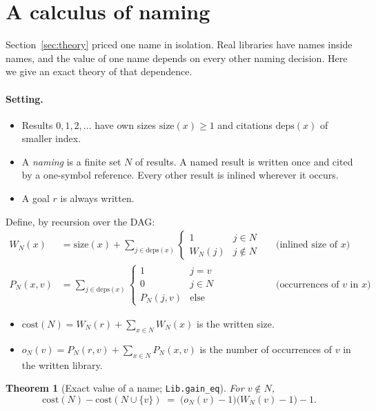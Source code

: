 \documentclass[11pt]{article}
\newtheorem{theorem}{Theorem}
\theoremstyle{remark}
\newcommand{\lean}[1]{\texttt{#1}}
\begin{document}
\section{A calculus of naming}\label{sec:calculus}

Section~\ref{sec:theory} priced one name in isolation. Real libraries have names inside
names, and the value of one name depends on every other naming decision. Here we give an
exact theory of that dependence.

\paragraph{Setting.}
\begin{itemize}
\item Results $0,1,2,\ldots$ have own sizes $\mathrm{size}(x)\ge1$ and citations
  $\mathrm{deps}(x)$ of smaller index.
\item A \emph{naming} is a finite set $N$ of results. A named result is written once and
  cited by a one-symbol reference. Every other result is inlined wherever it occurs.
\item A goal $r$ is always written.
\end{itemize}
Define, by recursion over the DAG:
\begin{align*}
W_N(x) &= \mathrm{size}(x)+\sum_{j\in\mathrm{deps}(x)}\begin{cases}1 & j\in N\\ W_N(j) & j\notin N\end{cases}
&&\text{(inlined size of $x$)}\\
P_N(x,v) &= \sum_{j\in\mathrm{deps}(x)}\begin{cases}1 & j=v\\ 0 & j\in N\\ P_N(j,v) & \text{else}\end{cases}
&&\text{(occurrences of $v$ in $x$)}
\end{align*}
\begin{itemize}
\item $\mathrm{cost}(N)=W_N(r)+\sum_{x\in N}W_N(x)$ is the written size.
\item $o_N(v)=P_N(r,v)+\sum_{x\in N}P_N(x,v)$ is the number of occurrences of $v$ in the
  written library.
\end{itemize}

\begin{theorem}[Exact value of a name; \lean{Lib.gain\_eq}]\label{thm:exact}
For $v\notin N$,
\[
\mathrm{cost}(N)-\mathrm{cost}(N\cup\{v\}) \;=\; \bigl(o_N(v)-1\bigr)\bigl(W_N(v)-1\bigr)-1 .
\]
\end{theorem}
\end{document}
